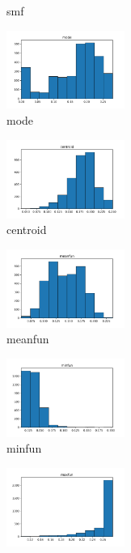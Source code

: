 \documentclass[a4paper]{article}    %
\begin{document}
\begin{figure}[H]
\begin{subfigure}{0.32\textwidth}
        \caption{smf}
        \label{fig:sub_raw_9}
    \end{subfigure}\hfill
    \begin{subfigure}{0.32\textwidth}
        \centering
        \includegraphics[width=3.85cm]{raw_9_mode}
        \caption{mode}
        \label{fig:sub_raw_10}
    \end{subfigure}\hfill
    \begin{subfigure}{0.32\textwidth}
        \centering
        \includegraphics[width=3.85cm]{raw_10_centroid}
        \caption{centroid}
        \label{fig:sub_raw_11}
    \end{subfigure}\hfill
    \begin{subfigure}{0.32\textwidth}
        \centering
        \includegraphics[width=3.85cm]{raw_11_meanfun}
        \caption{meanfun}
        \label{fig:sub_raw_12}
    \end{subfigure}\hfill
    \begin{subfigure}{0.32\textwidth}
        \centering
        \includegraphics[width=3.85cm]{raw_12_minfun}
        \caption{minfun}
        \label{fig:sub_raw_13}
    \end{subfigure}\hfill
    \begin{subfigure}{0.32\textwidth}
        \centering
        \includegraphics[width=3.85cm]{raw_13_maxfun}

\end{subfigure}
\end{figure}
\end{document}
